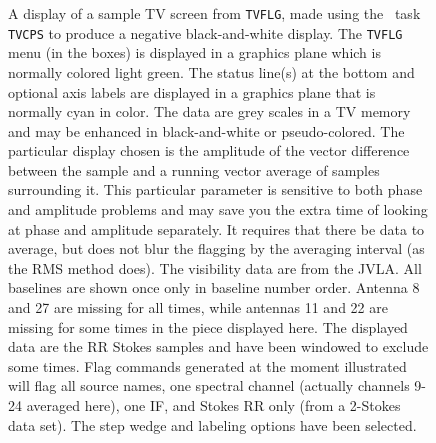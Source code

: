 \begin{figure}
\centering
\caption[{\tt TVFLG} display]{A display of a sample TV screen from
\hbox{{\tt TVFLG}}, made using the \AIPS\ task {\tt TVCPS} to produce
a negative black-and-white display.  The {\tt TVFLG} menu (in the
boxes) is displayed in a graphics plane which is normally colored
light green.  The status line(s) at the bottom and optional axis
labels are displayed in a graphics plane that is normally cyan in
color.  The data are grey scales in a TV memory and may be enhanced in
black-and-white or pseudo-colored. The particular display chosen is
the amplitude of the vector difference between the sample and a
running vector average of samples surrounding it.  This particular
parameter is sensitive to both phase and amplitude problems and may
save you the extra time of looking at phase and amplitude separately.
It requires that there be data to average, but does not blur the
flagging by the averaging interval (as the RMS method does).  The
visibility data are from the JVLA\@.  All baselines are shown once
only in baseline number order.  Antenna 8 and 27 are missing for all
times, while antennas 11 and 22 are missing for some times in the
piece displayed here.  The displayed data are the RR Stokes samples
and have been windowed to exclude some times.  Flag commands generated
at the moment illustrated will flag all source names, one spectral
channel (actually channels 9-24 averaged here), one IF, and Stokes RR
only (from a 2-Stokes data set).  The step wedge and labeling options
have been selected.
 }
\label{fig:tvflg}
\end{figure}


